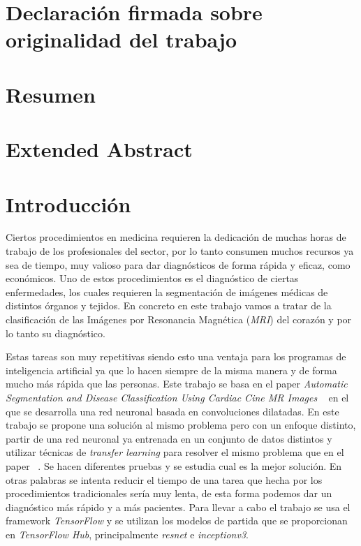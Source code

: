 \documentclass[12pt,a4paper]{article}
\begin{document}
\newpage
\listoftables

\newpage
{}
\section*{Declaración firmada sobre originalidad del trabajo}

\newpage
\section*{Resumen}

\newpage
\section*{Extended Abstract}

\newpage
\section{Introducción}
\fancyhead[L]{\nouppercase{\rightmark}}

Ciertos procedimientos en medicina requieren la dedicación de muchas horas de trabajo de los profesionales del sector, por lo tanto consumen muchos recursos ya sea de tiempo, muy valioso para dar diagnósticos de forma rápida y eficaz, como económicos. Uno de estos procedimientos es el diagnóstico de ciertas enfermedades, los cuales requieren la segmentación de imágenes médicas de distintos órganos y tejidos. En concreto en este trabajo vamos a tratar de la clasificación de las Imágenes por Resonancia Magnética (\textit{MRI}) del corazón y por lo tanto su diagnóstico.
\bigskip

Estas tareas son muy repetitivas siendo esto una ventaja para los programas de inteligencia artificial ya que lo hacen siempre de la misma manera y de forma mucho más rápida que las personas. Este trabajo se basa en el paper \textit{Automatic Segmentation and Disease Classification Using Cardiac Cine MR Images} ~\cite{DBLP:journals/corr/abs-1708-01141} en el que se desarrolla una red neuronal basada en convoluciones dilatadas. En este trabajo se propone una solución al mismo problema pero con un enfoque distinto, partir de una red neuronal ya entrenada en un conjunto de datos distintos y utilizar técnicas de \textit{transfer learning} para resolver el mismo problema que en el paper ~\cite{DBLP:journals/corr/abs-1708-01141}. Se hacen diferentes pruebas y se estudia cual es la mejor solución. En otras palabras se intenta reducir el tiempo de una tarea que hecha por los procedimientos tradicionales sería muy lenta, de esta forma podemos dar un diagnóstico más rápido y a más pacientes. Para llevar a cabo el trabajo se usa el framework \textit{TensorFlow} y se utilizan los modelos de partida que se proporcionan en \textit{TensorFlow Hub}, principalmente \textit{resnet} e \textit{inceptionv3}.
\end{document}
